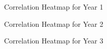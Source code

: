 \label{sec:corrHeat}
\begin{figure}[h]
\centering
{}
\caption{Correlation Heatmap for Year 1 }
\end{figure}

\begin{figure}
\centering
{}
\caption{Correlation Heatmap for Year 2 }
\end{figure}

\begin{figure}
\centering
{}
\caption{Correlation Heatmap for Year 3 }
\end{figure}

